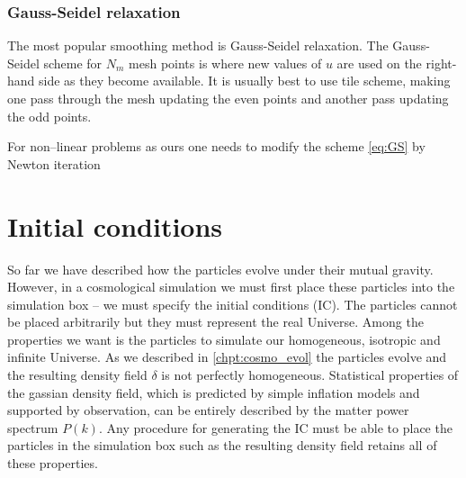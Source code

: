 \subsubsection{Gauss-Seidel relaxation}
The most popular smoothing method is Gauss-Seidel relaxation. The Gauss-Seidel scheme for $N_m$ mesh points is
where new values of $u$ are used on the right-hand side as they become available. It is usually best to use tile scheme,  making one pass through the mesh updating the even points and another pass updating the odd points.

For non--linear problems as ours one needs to modify the scheme \eqref{eq:GS} by Newton iteration
\section{Initial conditions}
So far we have described how the particles evolve under their mutual gravity. However, in a cosmological simulation we must first place these particles into the simulation box -- we must specify the initial conditions (IC). The particles cannot be placed arbitrarily but they must represent the real Universe. Among the properties we want is the particles to simulate our homogeneous, isotropic and infinite Universe. As we described in \autoref{chpt:cosmo_evol} the particles evolve and the resulting density field $\delta$ is not perfectly homogeneous. Statistical properties of the gassian density field, which is predicted by simple inflation models and supported by observation, can be entirely described by the matter power spectrum $P(k)$. Any procedure for generating the IC must be able to place the particles in the simulation box such as the resulting density field retains all of these properties.

